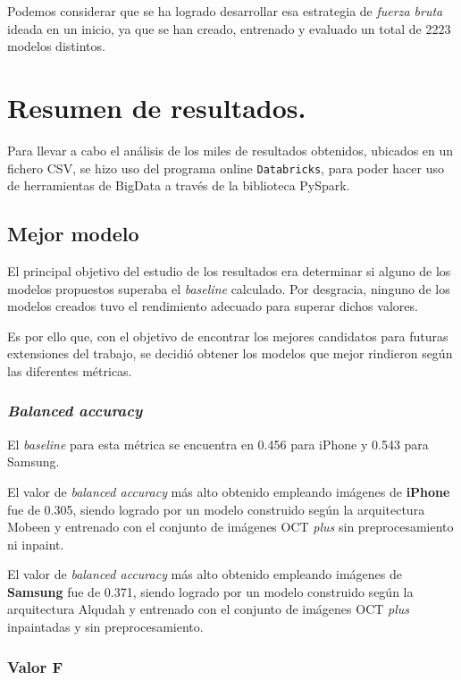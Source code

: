 Podemos considerar que se ha logrado desarrollar esa estrategia de \textit{fuerza bruta} ideada en un inicio, ya que se han creado, entrenado y evaluado un total de 2223 modelos distintos.

\section{Resumen de resultados.}

Para llevar a cabo el análisis de los miles de resultados obtenidos, ubicados en un fichero CSV, se hizo uso del programa online \texttt{Databricks}, para poder hacer uso de herramientas de BigData a través de la biblioteca PySpark.

\subsection{Mejor modelo}

El principal objetivo del estudio de los resultados era determinar si alguno de los modelos propuestos superaba el \textit{baseline} calculado. Por desgracia, ninguno de los modelos creados tuvo el rendimiento adecuado para superar dichos valores.

Es por ello que, con el objetivo de encontrar los mejores candidatos para futuras extensiones del trabajo, se decidió obtener los modelos que mejor rindieron según las diferentes métricas.

\subsubsection{\textit{Balanced accuracy}}

El \textit{baseline} para esta métrica se encuentra en 0.456 para iPhone y 0.543 para Samsung.

El valor de \textit{balanced accuracy} más alto obtenido empleando imágenes de \textbf{iPhone} fue de 0.305, siendo logrado por un modelo construido según la arquitectura Mobeen y entrenado con el conjunto de imágenes OCT \textit{plus} sin preprocesamiento ni inpaint.

El valor de \textit{balanced accuracy} más alto obtenido empleando imágenes de \textbf{Samsung} fue de 0.371, siendo logrado por un modelo construido según la arquitectura Alqudah y entrenado con el conjunto de imágenes OCT \textit{plus} inpaintadas y sin preprocesamiento.

\subsubsection{Valor F}


